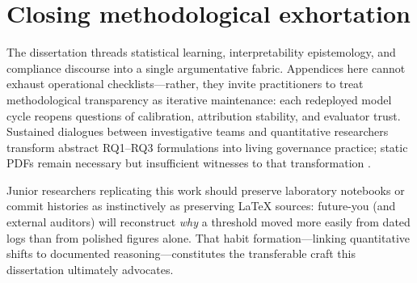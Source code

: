 \chapter{Closing methodological exhortation}
The dissertation threads statistical learning, interpretability epistemology, and compliance discourse into a single argumentative fabric. Appendices here cannot exhaust operational checklists—rather, they invite practitioners to treat methodological transparency as iterative maintenance: each redeployed model cycle reopens questions of calibration, attribution stability, and evaluator trust. Sustained dialogues between investigative teams and quantitative researchers transform abstract RQ1--RQ3 formulations into living governance practice; static PDFs remain necessary but insufficient witnesses to that transformation \cite{fraud_handbook,lucas_jurgovsky_ccfraud_survey2020}.

Junior researchers replicating this work should preserve laboratory notebooks or commit histories as instinctively as preserving LaTeX sources: future-you (and external auditors) will reconstruct \emph{why} a threshold moved more easily from dated logs than from polished figures alone. That habit formation—linking quantitative shifts to documented reasoning—constitutes the transferable craft this dissertation ultimately advocates.
